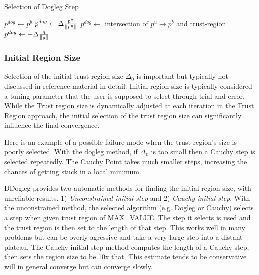 \begin{algorithm}{}
\caption{\label{alg:dogleg_step}Selection of Dogleg Step}
\begin{algorithmic}[1]
     
      \State $p^{dog} \gets p^b$
     
    \State $p^{dog} \gets \Delta \frac{p^u}{\left\lVert p^u\right\rVert}$
    \Else
    \State $p^{dog} \gets $ intersection of $p^u \rightarrow p^b$ and trust-region
    \EndIf
  \Else
   \State $p^{dog} \gets -\Delta\frac{g}{\left\lVert g\right\rVert}$ 
  \EndIf
\end{algorithmic}
\end{algorithm}

\subsubsection{Initial Region Size}
\label{section:init_region_size}

Selection of the initial trust region size $\Delta_0$ is important but typically not discussed in reference material \cite{fletcher1987,numopt2006,IMM2004} in detail. Initial region size is typically considered a tuning parameter that the user is supposed to select through trial and error. While the Trust region size is dynamically adjusted at each iteration in the Trust Region approach, the initial selection of the trust region size can significantly influence the final convergence.

Here is an example of a possible failure mode when the trust region's size is poorly selected. With the dogleg method, if $\Delta_0$ is too small then a Cauchy step is selected repeatedly. The Cauchy Point takes much smaller steps, increasing the chances of getting stuck in a local minimum.

DDogleg provides two automatic methods for finding the initial region size, with unreliable results. 1) \emph{Unconstrained initial step} and 2) \emph{Cauchy initial step}. With the unconstrained method, the selected algorithm (e.g. Dogleg or Cauchy) selects a step when given trust region of MAX\_VALUE. The step it selects is used and the trust region is then set to the length of that step. This works well in many problems but can be overly agressive and take a very large step into a distant plateau. The Cauchy initial step method computes the length of a Cauchy step, then sets the region size to be 10x that. This estimate tends to be conservative will in general converge but can converge slowly.

